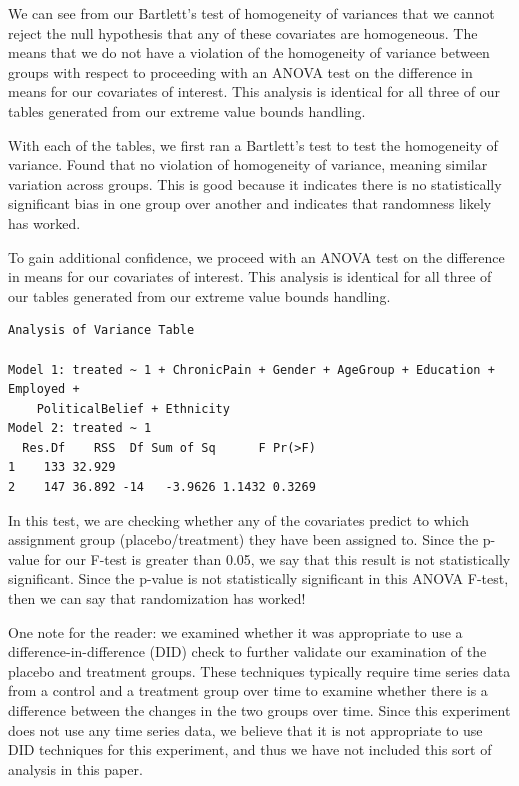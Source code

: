 \documentclass[
]{article}
\begin{document}
We can see from our Bartlett's test of homogeneity of variances that we
cannot reject the null hypothesis that any of these covariates are
homogeneous. The means that we do not have a violation of the
homogeneity of variance between groups with respect to proceeding with
an ANOVA test on the difference in means for our covariates of interest.
This analysis is identical for all three of our tables generated from
our extreme value bounds handling.

With each of the tables, we first ran a Bartlett's test to test the
homogeneity of variance. Found that no violation of homogeneity of
variance, meaning similar variation across groups. This is good because
it indicates there is no statistically significant bias in one group
over another and indicates that randomness likely has worked.

To gain additional confidence, we proceed with an ANOVA test on the
difference in means for our covariates of interest. This analysis is
identical for all three of our tables generated from our extreme value
bounds handling.

\begin{verbatim}
Analysis of Variance Table

Model 1: treated ~ 1 + ChronicPain + Gender + AgeGroup + Education + Employed + 
    PoliticalBelief + Ethnicity
Model 2: treated ~ 1
  Res.Df    RSS  Df Sum of Sq      F Pr(>F)
1    133 32.929                            
2    147 36.892 -14   -3.9626 1.1432 0.3269
\end{verbatim}

In this test, we are checking whether any of the covariates predict to
which assignment group (placebo/treatment) they have been assigned to.
Since the p-value for our F-test is greater than 0.05, we say that this
result is not statistically significant. Since the p-value is not
statistically significant in this ANOVA F-test, then we can say that
randomization has worked!

One note for the reader: we examined whether it was appropriate to use a
difference-in-difference (DID) check to further validate our examination
of the placebo and treatment groups. These techniques typically require
time series data from a control and a treatment group over time to
examine whether there is a difference between the changes in the two
groups over time. Since this experiment does not use any time series
data, we believe that it is not appropriate to use DID techniques for
this experiment, and thus we have not included this sort of analysis in
this paper.
\end{document}
